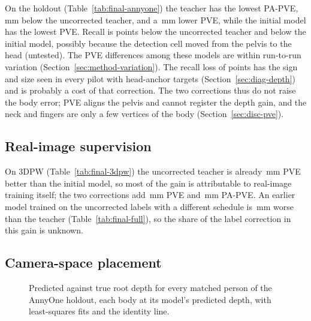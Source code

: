 On the holdout (Table~\ref{tab:final-annyone}) the teacher has the lowest PA-PVE, \GapPAPVE\,mm below the
uncorrected teacher, and a \GapPVE\,mm lower PVE, while the initial model has the lowest PVE. Recall is
\GapRecallControl{} points below the uncorrected teacher and \GapRecallBase{} below the initial model, possibly
because the detection cell moved from the pelvis to the head (untested). The PVE differences among these
models are within run-to-run variation (Section~\ref{sec:method-variation}). The recall loss of \GapRecallControl{}
points has the sign and size seen in every pilot with head-anchor targets (Section~\ref{sec:diag-depth}) and is
probably a cost of that correction. The two corrections thus do
not raise the body error; PVE aligns the pelvis and cannot register the depth gain, and the neck and fingers are
only a few vertices of the body (Section~\ref{sec:disc-pve}).

\subsection{Real-image supervision}
\label{sec:res-3dpw}

On 3DPW (Table~\ref{tab:final-3dpw}) the uncorrected teacher is already \GainBaseToControlThreeDPW\,mm PVE better
than the initial model, so most of the gain is attributable to real-image training itself; the two corrections add
\GainFixesThreeDPW\,mm PVE and \GainFixesPAThreeDPW\,mm PA-PVE. An earlier model trained on the uncorrected labels
with a different schedule is \GainOverOldThreeDPW\,mm worse than the teacher (Table~\ref{tab:final-full}), so the
share of the label correction in this gain is unknown.

\subsection{Camera-space placement}
\label{sec:res-depth}

\begin{figure}[!tbp]
\centering

\caption[Predicted against true root depth on the holdout]{Predicted against true root depth for every matched
person of the AnnyOne holdout, each body at its model's predicted depth, with least-squares fits and the identity
line.}
\label{fig:depth-scatter}
\end{figure}

